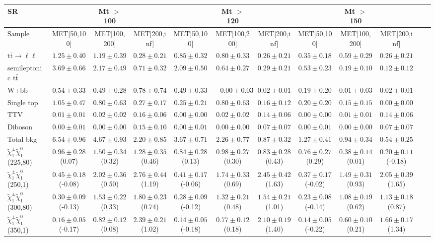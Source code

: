 \begin{table}
\begin{center}
\small
\begin{tabular}{lccccccccccc}
\hline
SR & & Mt $>$ 100 & & & Mt $>$ 120 & & &Mt $>$ 150 & & &\\
\hline
Sample&MET[50,100]&MET[100,200]&MET[200,inf]&MET[50,100]&MET[100,200]&MET[200,inf]&MET[50,100]&MET[100,200]&MET[200,inf]&\\
\hline
$\mathrm{t}\bar{\mathrm{t}}\rightarrow \ell\ell$&$1.25\pm0.40$&$1.19\pm0.39$&$0.28\pm0.21$&$0.85\pm0.32$&$0.80\pm0.33$&$0.26\pm0.21$&$0.35\pm0.18$&$0.59\pm0.29$&$0.26\pm0.21$\\
semileptonic $\mathrm{t}\bar{\mathrm{t}}$&$3.69\pm0.66$&$2.17\pm0.49$&$0.71\pm0.32$&$2.09\pm0.50$&$0.64\pm0.27$&$0.29\pm0.21$&$0.53\pm0.23$&$0.19\pm0.10$&$0.12\pm0.12$\\
W+bb&$0.54\pm0.33$&$0.49\pm0.28$&$0.78\pm0.74$&$0.49\pm0.33$&$-0.00\pm0.03$&$0.02\pm0.01$&$0.19\pm0.20$&$0.01\pm0.03$&$0.02\pm0.01$\\
Single top&$1.05\pm0.47$&$0.80\pm0.63$&$0.27\pm0.17$&$0.25\pm0.21$&$0.80\pm0.63$&$0.16\pm0.12$&$0.20\pm0.20$&$0.15\pm0.15$&$0.00\pm0.00$\\
TTV&$0.01\pm0.01$&$0.02\pm0.02$&$0.16\pm0.06$&$0.00\pm0.00$&$0.02\pm0.02$&$0.14\pm0.06$&$0.00\pm0.00$&$0.01\pm0.01$&$0.14\pm0.06$\\
Diboson&$0.00\pm0.01$&$0.00\pm0.00$&$0.15\pm0.10$&$0.00\pm0.01$&$0.00\pm0.00$&$0.07\pm0.07$&$0.00\pm0.01$&$0.00\pm0.00$&$0.07\pm0.07$\\
\hline
Total bkg&$6.54\pm0.96$&$4.67\pm0.93$&$2.20\pm0.85$&$3.67\pm0.71$&$2.26\pm0.77$&$0.87\pm0.32$&$1.27\pm0.41$&$0.94\pm0.34$&$0.54\pm0.25$\\
$\tilde{\chi}_{1}^{\pm}\tilde{\chi}_{1}^{0}$ (225,80)&$0.96\pm0.28$(0.07)&$1.50\pm0.34$(0.32)&$1.28\pm0.35$(0.46)&$0.84\pm0.28$(0.13)&$0.98\pm0.27$(0.30)&$0.83\pm0.28$(0.43)&$0.76\pm0.27$(0.29)&$0.38\pm0.14$(0.01)&$0.20\pm0.11$(-0.18)\\
$\tilde{\chi}_{1}^{\pm}\tilde{\chi}_{1}^{0}$ (250,1)&$0.45\pm0.18$(-0.08)&$2.02\pm0.36$(0.50)&$2.76\pm0.44$(1.19)&$0.41\pm0.17$(-0.06)&$1.74\pm0.33$(0.69)&$2.45\pm0.42$(1.63)&$0.37\pm0.17$(-0.02)&$1.49\pm0.31$(0.93)&$2.05\pm0.39$(1.65)\\
$\tilde{\chi}_{1}^{\pm}\tilde{\chi}_{1}^{0}$ (300,80)&$0.30\pm0.09$(-0.13)&$1.53\pm0.22$(0.33)&$1.80\pm0.23$(0.74)&$0.28\pm0.09$(-0.12)&$1.32\pm0.21$(0.48)&$1.54\pm0.21$(1.01)&$0.23\pm0.08$(-0.14)&$1.08\pm0.19$(0.62)&$1.13\pm0.18$(0.87)\\
$\tilde{\chi}_{1}^{\pm}\tilde{\chi}_{1}^{0}$ (350,1)&$0.16\pm0.05$(-0.17)&$0.82\pm0.12$(0.08)&$2.39\pm0.21$(1.02)&$0.14\pm0.05$(-0.18)&$0.77\pm0.12$(0.18)&$2.10\pm0.19$(1.40)&$0.14\pm0.05$(-0.22)&$0.60\pm0.10$(0.21)&$1.66\pm0.17$(1.34)\\
\hline
\hline\hline
\end{tabular}
\end{center}
\end{table}
